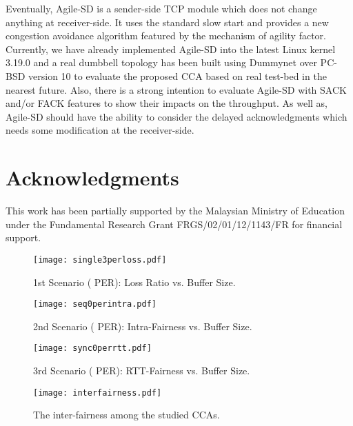 \documentclass[preprint,3p,times,twocolumn,authoryear]{elsarticle}
\begin{document}
Eventually, Agile-SD is a sender-side TCP module which does not change anything at receiver-side. It uses the standard slow start and provides a new congestion avoidance algorithm featured by the mechanism of agility factor. Currently, we have already implemented Agile-SD into the latest Linux kernel 3.19.0 and a real dumbbell topology has been built using Dummynet over PC-BSD version 10 to evaluate the proposed CCA based on real test-bed in the nearest future. Also, there is a strong intention to evaluate Agile-SD with SACK and/or FACK features to show their impacts on the throughput. As well as, Agile-SD should have the ability to consider the delayed acknowledgments which needs some modification at the receiver-side.

\section*{Acknowledgments}
This work has been partially supported by the Malaysian Ministry of Education under the Fundamental Research Grant FRGS/02/01/12/1143/FR for financial support.\\

\begin{figure}[h!]
\centering
\texttt{[image: single3perloss.pdf]}
\caption{1st Scenario ( PER): Loss Ratio vs. Buffer Size.}
\label{fig:single3perloss}
\end{figure}

\begin{figure}[h!]
\centering
\texttt{[image: seq0perintra.pdf]}
\caption{2nd Scenario ( PER): Intra-Fairness vs. Buffer Size.}
\label{fig:seq0perintra}
\end{figure}

\begin{figure}[h!]
\centering
\texttt{[image: sync0perrtt.pdf]}
\caption{3rd Scenario ( PER): RTT-Fairness vs. Buffer Size.}
\label{fig:sync0perrtt}
\end{figure}

\begin{figure}[h!]
\centering
\texttt{[image: interfairness.pdf]}
\caption{The inter-fairness among the studied CCAs.}
\label{fig:interfairness}
\end{figure}
\end{document}
